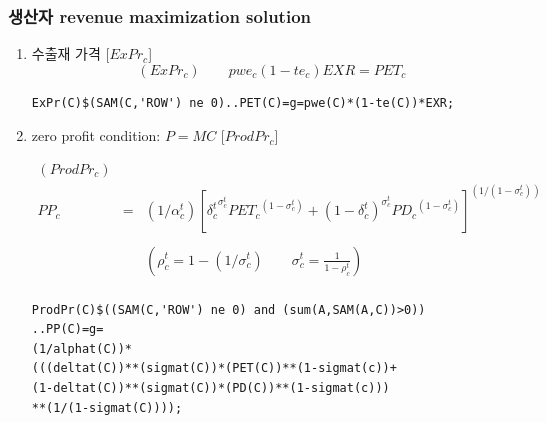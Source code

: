 \documentclass[10pt,compress,slidetop,%
			   hyperref={unicode},xcolor={svgnames},%
			   t]{beamer}
\begin{document}
\begin{frame}[fragile]
	\frametitle{생산자 revenue maximization solution}
\begin{scriptsize}
\begin{enumerate}
		\item{수출재 가격 [$ExPr_c$]}
\begin{displaymath}
(ExPr_c)\qquad pwe_c(1-te_c)EXR=PET_c
\end{displaymath}

\begin{verbatim}
ExPr(C)$(SAM(C,'ROW') ne 0)..PET(C)=g=pwe(C)*(1-te(C))*EXR;
\end{verbatim}
		\item{zero profit condition: $P=MC$ [$ProdPr_c$]}

\begin{eqnarray*}
(ProdPr_c)& &\\
PP_c&=&(1/\alpha^t_c)[{\delta^t_c}^{\sigma^t_c}{PET_c}^{(1-\sigma^t_c)}+{(1-\delta^t_c)}^{\sigma^t_c}{PD_c}^{(1-\sigma^t_c)}]^{(1/(1-\sigma^t_c))}\\
& &\\
& &\left(\rho^t_c=1-(1/\sigma^t_c)\qquad\sigma^t_c=\frac{1}{1-\rho^t_c}\right)\\
\end{eqnarray*}
\begin{verbatim}
ProdPr(C)$((SAM(C,'ROW') ne 0) and (sum(A,SAM(A,C))>0))
..PP(C)=g=
(1/alphat(C))*
(((deltat(C))**(sigmat(C))*(PET(C))**(1-sigmat(c))+ 
(1-deltat(C))**(sigmat(C))*(PD(C))**(1-sigmat(c)))
**(1/(1-sigmat(C))));
\end{verbatim}
\end{enumerate}
\end{scriptsize}
\end{frame}
\end{document}
